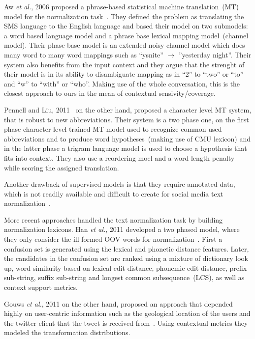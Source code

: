 \documentclass[a4paper,onesided,12pt]{report}
\begin{document}
Aw \textit{et al.}, 2006 proposed a phrase-based statistical machine translation~(MT) model for the normalization task~\cite{Aw:2006:PSM:1273073.1273078}. They defined the problem as translating the SMS language to the English language and based their model on two submodels: a word based language model and a phrase base lexical mapping model~(channel model). Their phase base model is an extended noisy channel model which does many word to many word mappings such as ``ysnite'' $\rightarrow$ ''yesterday night''. Their system also benefits from the input context and they argue that the strenght of their model is in its ability to disambiguate mapping as in ``2'' to ``two'' or ``to'' and ``w'' to ``with'' or ``who''. Making use of the whole conversation, this is the closest approach to ours in the mean of contextual sensivity/coverage.

Pennell and Liu, 2011~\cite{pennell2011character} on the other hand, proposed a character level MT system, that is robust to new abbreviations. Their system is a two phase one, on the first phase character level trained MT model used to recognize common used abbreviations and to produce word hypotheses~(making use of CMU lexicon) and in the latter phase a trigram language model is used to choose a hypothesis that fits into context. They also use a reordering moel and a word length penalty while scoring the assigned translation.

Another drawback of supervised models is that they require annotated data, which is not readily available and difficult to create for social media text normalization~\cite{DBLP:conf/emnlp/YangE13}.

More recent approaches handled the text normalization task by building normalization lexicons. Han \textit{et al.}, 2011 developed a two phased model, where they only consider the ill-formed OOV words for normalization~\cite{Han:2011:LNS:2002472.2002520}. First a confusion set is generated using the lexical and phonetic distance features. Later, the candidates in the confusion set are ranked using a mixture of dictionary look up, word similarity based on lexical edit distance, phonemic edit distance, prefix sub-string, suffix sub-string and longest common subsequence~(LCS), as well as context support metrics.

Gouws \textit{et al.}, 2011 on the other hand, proposed an approach that depended highly on user-centric information such as the geological location of the users and the twitter client that the tweet is received from~\cite{Gouws:2011:CBL:2021109.2021113}. Using contextual metrics they modeled the transformation distributions.
\end{document}
